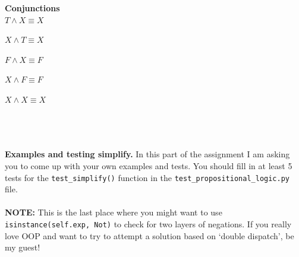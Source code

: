 \documentclass[12pt]{article}
\newenvironment{problem}[2][Problem]{\begin{trivlist}
\item[\hskip \labelsep {\bfseries #1}\hskip \labelsep {\bfseries #2.}]}{\end{trivlist}}
\begin{document}
\begin{problem}{2}
\begin{enumerate}[label=\Alph*.]
\begin{minipage}[t]{0.33\textwidth}
\textbf{Conjunctions} \\

$T \land X \equiv X$

$X \land T \equiv X$

$F \land X \equiv F$

$X \land F \equiv F$

$X \land X \equiv X$

\end{minipage} \\ \\ \\

\textbf{Examples and testing simplify.}
In this part of the assignment I am asking you to come up with your own examples and tests. You should fill in at least 5 tests for the \texttt{test\_simplify()} function in the \texttt{test\_propositional\_logic.py} file. \\ \\


\textbf{NOTE:} This is the last place where you might want to use \texttt{isinstance(self.exp, Not)} to check for two layers of negations. If you really love OOP and want to try to attempt a solution based on `double dispatch', be my guest!


\end{enumerate}

\end{problem}
\end{document}
